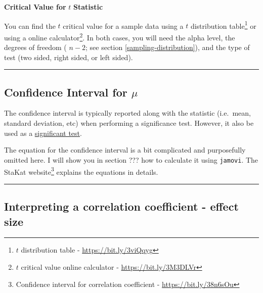 \documentclass[
]{article}
\begin{document}
\textbf{Critical Value for} \(t\) \textbf{Statistic}

You can find the \(t\) critical value for a sample data using a \(t\) distribution table\footnote{\(t\) distribution table - \url{https://bit.ly/3viQqyg}} or using a online calculator\footnote{\(t\) critical value online calculator - \url{https://bit.ly/3M3DLVr}}. In both cases, you will need the alpha level, the degrees of freedom ( \(n - 2\); see section \ref{sampling-distribution}), and the type of test (two sided, right sided, or left sided).

\begin{center}\rule{0.5\linewidth}{0.5pt}\end{center}

\hypertarget{confidence-interval-for-mu}{%
\subsection{\texorpdfstring{Confidence Interval for \(\mu\)}{Confidence Interval for \textbackslash mu}}\label{confidence-interval-for-mu}}

The confidence interval is typically reported along with the statistic (i.e.~mean, standard deviation, etc) when performing a significance test. However, it also be used as a \href{https://statkat.com/confidence-interval-as-test/one-sample-z-test.php}{significant test}.

The equation for the confidence interval is a bit complicated and purposefully omitted here. I will show you in section ??? how to calculate it using \texttt{jamovi}. The StaKat website\footnote{Confidence interval for correlation coefficient - \url{https://bit.ly/38n6sOu}} explains the equations in details.

\begin{center}\rule{0.5\linewidth}{0.5pt}\end{center}

\hypertarget{interpreting-a-correlation-coefficient---effect-size}{%
\subsection{Interpreting a correlation coefficient - effect size}\label{interpreting-a-correlation-coefficient---effect-size}}
\end{document}
